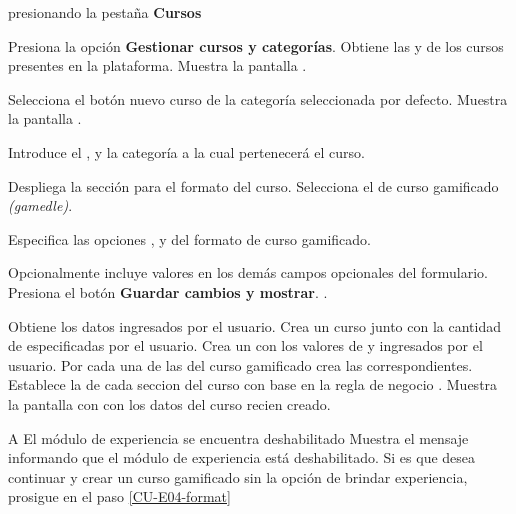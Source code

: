 \begin{UCtrayectoria}%
   presionando la pestaña {\bf Cursos}

  \Actor Presiona la opción {\bf Gestionar cursos y categorías}.
  \Sistema Obtiene las  y
            de los cursos presentes en la plataforma.
  \Sistema Muestra la pantalla .

  \Actor Selecciona el botón nuevo curso de la categoría seleccionada por defecto.
  \Sistema Muestra la pantalla .

  \Actor Introduce el ,  y
         la categoría a la cual pertenecerá el curso.

  \Actor Despliega la sección para el formato del curso.
  \Actor Selecciona el  de curso gamificado {\it(gamedle)}.
          \label{CU-E04-format}

  \Actor Especifica las opciones ,
          y  
         del formato de curso gamificado.  

  \Actor Opcionalmente incluye valores en los demás campos opcionales del formulario.
  \Actor Presiona el botón {\bf Guardar cambios y mostrar}.  
          \label{CU-E04-submit}.

  \Sistema Obtiene los datos ingresados por el usuario.
  \Sistema Crea un curso  junto con la cantidad de
            especificadas por el usuario.
  \Sistema Crea un  con los valores de  
           y  ingresados por el usuario.
  \Sistema Por cada una de las  del curso gamificado
           crea las  correspondientes.
  \Sistema Establece la  de cada seccion del curso con base
           en la regla de negocio . \label{CU-E04-finish}
  \Sistema Muestra la pantalla con  con los datos del curso recien
           creado.

\end{UCtrayectoria}

\begin{UCtrayectoriaA}{A}{%
El módulo de experiencia se encuentra deshabilitado
}
  \Sistema Muestra el mensaje informando que el módulo de experiencia está
           deshabilitado.
  \Actor Si es que desea continuar y crear un curso gamificado sin la opción
         de brindar experiencia, prosigue en el paso \ref{CU-E04-format}

\end{UCtrayectoriaA}

